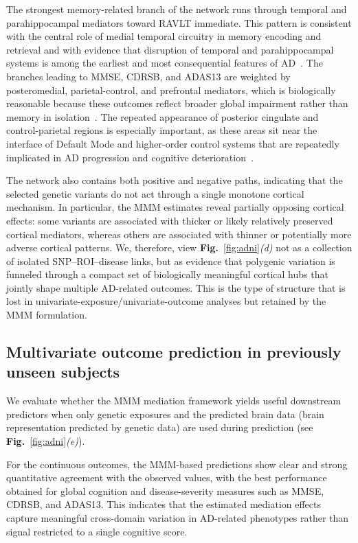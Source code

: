 \documentclass[
  12pt]{article}
\begin{document}
The strongest memory-related branch of the network runs through temporal and parahippocampal mediators toward RAVLT immediate.
This pattern is consistent with the central role of medial temporal circuitry in memory encoding and retrieval and with evidence that disruption of temporal and parahippocampal systems is among the earliest and most consequential features of AD~\citep{berron2020medial,tang2024multimodal}.
The branches leading to MMSE, CDRSB, and ADAS13 are weighted by posteromedial, parietal-control, and prefrontal mediators, which is biologically reasonable because these outcomes reflect broader global impairment rather than memory in isolation~\citep{lee2020posterior,katsumi2023association}.
The repeated appearance of posterior cingulate and control-parietal regions is especially important, as these areas sit near the interface of Default Mode and higher-order control systems that are repeatedly implicated in AD progression and cognitive deterioration~\citep{mohan2016significance,lee2020posterior,katsumi2024greater}.

The network also contains both positive and negative paths, indicating that the selected genetic variants do not act through a single monotone cortical mechanism.
In particular, the MMM estimates reveal partially opposing cortical effects: some variants are associated with thicker or likely relatively preserved cortical mediators, whereas others are associated with thinner or potentially more adverse cortical patterns.
We, therefore, view \textbf{Fig.}~\ref{fig:adni}\textit{(d)} not as a collection of isolated SNP--ROI--disease links, but as evidence that polygenic variation is funneled through a compact set of biologically meaningful cortical hubs that jointly shape multiple AD-related outcomes.
This is the type of structure that is lost in univariate-exposure/univariate-outcome analyses but retained by the MMM formulation.

\subsection{Multivariate outcome prediction in previously unseen subjects} \label{subsection:prediction}
We evaluate whether the MMM mediation framework yields useful downstream predictors when only genetic exposures and the predicted brain data (brain representation predicted by genetic data) are used during prediction (see \textbf{Fig.}~\ref{fig:adni}\textit{(e)}).

For the continuous outcomes, the MMM-based predictions show clear and strong quantitative agreement with the observed values, with the best performance obtained for global cognition and disease-severity measures such as MMSE, CDRSB, and ADAS13.
This indicates that the estimated mediation effects capture meaningful cross-domain variation in AD-related phenotypes rather than signal restricted to a single cognitive score.
\end{document}
